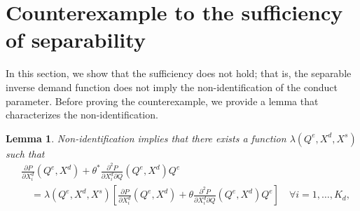 \documentclass[11pt, a4paper]{article}
\newtheorem{lemma}{Lemma}
\theoremstyle{remark}
\begin{document}
\section{Counterexample to the sufficiency of separability}\label{sec:counterexample_sufficiency}
In this section, we show that the sufficiency does not hold; that is, the separable inverse demand function does not imply the non-identification of the conduct parameter.
Before proving the counterexample, we provide a lemma that characterizes the non-identification.
\begin{lemma}\label{lemma:non-identification_transformation}
    Non-identification implies that there exists a function $\lambda(Q^e, X^{d}, X^{s})$ such that
    \begin{align}
        &\frac{\partial P}{\partial X^{d}_i}(Q^e, X^{d}) + \theta^{*}\frac{\partial^2 P}{\partial X^{d}_{i}\partial Q}(Q^e, X^{d})Q^e \\
        &\quad = \lambda(Q^e, X^{d}, X^{s}) \left[\frac{\partial P}{\partial X^{d}_i}(Q^e, X^{d}) + \theta\frac{\partial^2 P}{\partial X^{d}_{i}\partial Q}(Q^e, X^{d})Q^e \right] \quad \forall i = 1, \ldots, K_d,\label{eq:lambda_foc_demand}
    \end{align}
\end{lemma}
\end{document}
